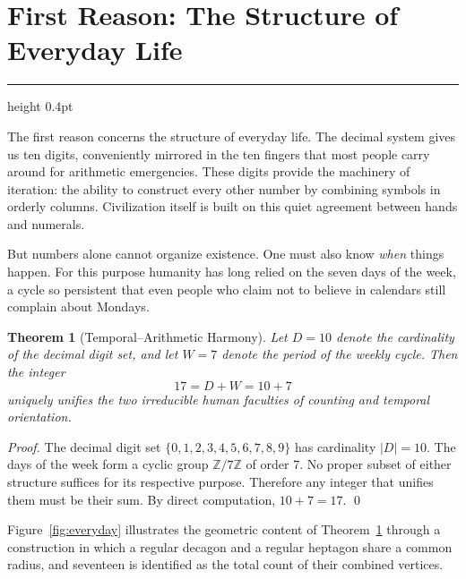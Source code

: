 \documentclass[11pt]{article}
\theoremstyle{plain}
\newtheorem{theorem}{Theorem}[section]
\theoremstyle{definition}
\theoremstyle{remark}
\newcommand{\sectionrule}{%
  \vspace{2pt}%
  {\color{rulegray}\hrule height 0.4pt}%
  \vspace{8pt}%
}
\begin{document}
\section{First Reason: The Structure of Everyday Life}
\sectionrule

The first reason concerns the structure of everyday life. The decimal system
gives us ten digits, conveniently mirrored in the ten fingers that most people
carry around for arithmetic emergencies. These digits provide the machinery of
iteration: the ability to construct every other number by combining symbols
in orderly columns. Civilization itself is built on this quiet agreement
between hands and numerals.

But numbers alone cannot organize existence. One must also know \emph{when}
things happen. For this purpose humanity has long relied on the seven days of
the week, a cycle so persistent that even people who claim not to believe in
calendars still complain about Mondays.

\begin{theorem}[Temporal--Arithmetic Harmony]
\label{thm:everyday}
Let $D = 10$ denote the cardinality of the decimal digit set, and let
$W = 7$ denote the period of the weekly cycle. Then the integer
\[
    17 = D + W = 10 + 7
\]
uniquely unifies the two irreducible human faculties of counting and
temporal orientation.
\end{theorem}

\begin{proof}
The decimal digit set $\{0, 1, 2, 3, 4, 5, 6, 7, 8, 9\}$ has cardinality
$|D| = 10$. The days of the week form a cyclic group $\mathbb{Z}/7\mathbb{Z}$
of order $7$. No proper subset of either structure suffices for its respective
purpose. Therefore any integer that unifies them must be their sum.
By direct computation, $10 + 7 = 17$. \qed
\end{proof}

Figure~\ref{fig:everyday} illustrates the geometric content of
Theorem~\ref{thm:everyday} through a construction in which a regular
decagon and a regular heptagon share a common radius, and seventeen
is identified as the total count of their combined vertices.
\end{document}
